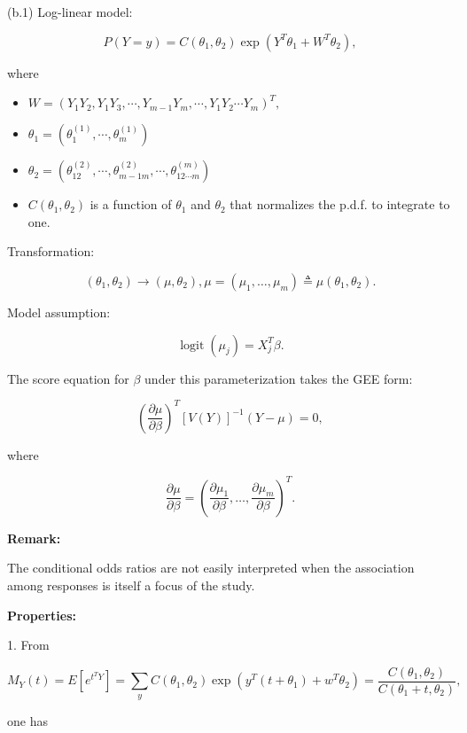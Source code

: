 \documentclass[UTF8,a4paper,10pt]{article}
\begin{document}
\begin{Problem}[]{}
  (b.1) Log-linear model: 
  
  \[P(Y=y)=C\left(\theta_1, \theta_2\right) \exp \left(Y^T \theta_1+W^T \theta_2\right),\] 
  
  where 

  \begin{itemize}
    \item \(W=\left(Y_1 Y_2, Y_1 Y_3, \cdots, Y_{m-1} Y_m, \cdots, Y_1 Y_2 \cdots Y_m\right)^T, \)
    \item \(\theta_1=\left(\theta_1^{(1)}, \cdots, \theta_m^{(1)}\right)\)
    \item \(\theta_2=\left(\theta_{12}^{(2)}, \cdots, \theta_{m-1 m}^{(2)}, \cdots, \theta_{12 \cdots m}^{(m)}\right)\)
    \item \(C(\theta_1, \theta_2)\) is a function of \(\theta_1\) and \(\theta_2\) that normalizes the p.d.f. to integrate to one.

  \end{itemize}


Transformation: 

\[\left(\theta_1, \theta_2\right) \rightarrow\left(\mu, \theta_2\right), \mu=\left(\mu_1, \ldots, \mu_m\right) \triangleq \mu\left(\theta_1, \theta_2\right).\]

Model assumption: 

\[\operatorname{logit}\left(\mu_j\right)=X_j^T \beta.\]

The score equation for $\beta$ under this parameterization takes the GEE form:


\[\left(\frac{\partial \mu}{\partial \beta}\right)^T[V(Y)]^{-1}(Y-\mu)=0,\] 

where  

\[\frac{\partial \mu}{\partial \beta}=\left(\frac{\partial \mu_1}{\partial \beta}, \ldots, \frac{\partial \mu_m}{\partial \beta}\right)^T.\]


\textbf{Remark: }

The conditional odds ratios are not easily interpreted when the association among responses is itself a focus of the study.

\textbf{Properties: }

1. From 

\[M_Y(t)=E\left[e^{t^T Y}\right]=\sum_y C\left(\theta_1, \theta_2\right) \exp \left(y^T\left(t+\theta_1\right)+w^T \theta_2\right)=\frac{C\left(\theta_1, \theta_2\right)}{C\left(\theta_1+t, \theta_2\right)},\] 

one has


\end{Problem}
\end{document}
